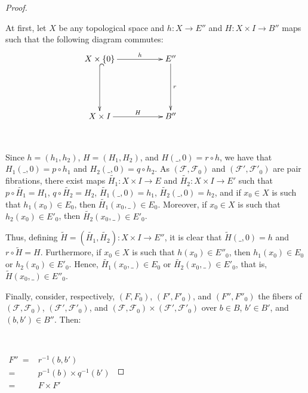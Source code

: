 \documentclass[12pt,oneside]{book}
\newcommand{\wt}{\widetilde}
\begin{document}
    \begin{proof}
    
    \
    
        At first, let $X$ be any topological space and $h:X\to E''$ and $H:X\times I\to B''$ maps such that the following diagram commutes:
        $$\xymatrix @C=0.5cm {
            X\times\{ 0 \} \ar[rrr]^-{h} \ar@{^(->}[dd] &&& E'' \ar[dd]^-{r} \\
            &&& &&& \\
            X\times I \ar[rrr]^-{H} &&& B'' 
        }$$

        \
        
        Since $h=(h_{1},h_{2})$, $H=(H_{1},H_{2})$, and $H(\_,0)=r\circ h$, we have that $H_{1}(\_,0)=p\circ h_{1}$ and 
        $H_{2}(\_,0)=q\circ h_{2}$. As $(\mathcal{F},\mathcal{F}_{0})$ and $(\mathcal{F'},\mathcal{F'}_{0})$ are pair fibrations, there 
        exist maps $\wt{H_{1}}:X\times I\to E$ and $\wt{H_{2}}:X\times I\to E'$ such that $p\circ\wt{H_{1}}=H_{1}$, $q\circ\wt{H_{2}}=H_{2}$, 
        $\wt{H_{1}}(\_,0)=h_{1}$, $\wt{H_{2}}(\_,0)=h_{2}$, and if $x_{0}\in X$ is such that $h_{1}(x_{0})\in E_{0}$, then 
        $\wt{H_{1}}(x_{0},\_)\in E_{0}$. Moreover, if $x_{0}\in X$ is such that $h_{2}(x_{0})\in E'_{0}$, then 
        $\wt{H_{2}}(x_{0},\_)\in E'_{0}$.
        
        Thus, defining $\wt{H}=(\wt{H_{1}},\wt{H_{2}}):X\times I\to E''$, it is clear that $\wt{H}(\_,0)=h$ and $r\circ\wt{H}=H$. 
        Furthermore, if $x_{0}\in X$ is such that $h(x_{0})\in E''_{0}$, then $h_{1}(x_{0})\in E_{0}$ or $h_{2}(x_{0})\in E'_{0}$. 
        Hence, $\wt{H_{1}}(x_{0},\_)\in E_{0}$ or $\wt{H_{2}}(x_{0},\_)\in E'_{0}$, that is, $\wt{H}(x_{0},\_)\in E''_{0}$.
        
        Finally, consider, respectively, $(F,F_{0})$, $(F',F'_{0})$, and $(F'',F''_{0})$ the fibers of 
        $(\mathcal{F},\mathcal{F}_{0})$, $(\mathcal{F'},\mathcal{F'}_{0})$, and 
        $(\mathcal{F},\mathcal{F}_{0})\times (\mathcal{F'},\mathcal{F'}_{0})$ over $b\in B$, $b'\in B'$, and $(b,b')\in B''$. Then:

        \
        
        $\begin{array}{rl}
            F'' \ = & r^{-1}(b,b') \\
            = & p^{-1}(b)\times q^{-1}(b') \\
            = & F\times F'
        \end{array}$
        

\end{proof}
\end{document}
